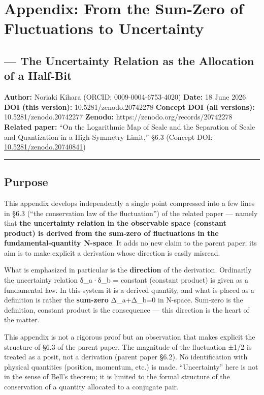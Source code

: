 \documentclass[11pt]{ltjsarticle}
\begin{document}
\section{Appendix: From the Sum-Zero of Fluctuations to
Uncertainty}\label{appendix-from-the-sum-zero-of-fluctuations-to-uncertainty}

\subsection{--- The Uncertainty Relation as the Allocation of a
Half-Bit}\label{the-uncertainty-relation-as-the-allocation-of-a-half-bit}

\textbf{Author:} Noriaki Kihara (ORCID: 0009-0004-6753-4020)
\textbf{Date:} 18 June 2026 \textbf{DOI (this version):}
10.5281/zenodo.20742278 \textbf{Concept DOI (all versions):}
10.5281/zenodo.20742277 \textbf{Zenodo:}
https://zenodo.org/records/20742278 \textbf{Related paper:} ``On the
Logarithmic Map of Scale and the Separation of Scale and Quantization in
a High-Symmetry Limit,'' §6.3 (Concept DOI:
\href{https://doi.org/10.5281/zenodo.20740841}{10.5281/zenodo.20740841})

\begin{center}\rule{0.5\linewidth}{0.5pt}\end{center}

\subsection{Purpose}\label{purpose}

This appendix develops independently a single point compressed into a
few lines in §6.3 (``the conservation law of the fluctuation'') of the
related paper --- namely that \textbf{the uncertainty relation in the
observable space (constant product) is derived from the sum-zero of
fluctuations in the fundamental-quantity N-space}. It adds no new claim
to the parent paper; its aim is to make explicit a derivation whose
direction is easily misread.

What is emphasized in particular is the \textbf{direction} of the
derivation. Ordinarily the uncertainty relation δ\_a·δ\_b = constant
(constant product) is given as a fundamental law. In this system it is a
derived quantity, and what is placed as a definition is rather the
\textbf{sum-zero} Δ\_a+Δ\_b=0 in N-space. Sum-zero is the definition,
constant product is the consequence --- this direction is the heart of
the matter.

This appendix is not a rigorous proof but an observation that makes
explicit the structure of §6.3 of the parent paper. The magnitude of the
fluctuation ±1/2 is treated as a posit, not a derivation (parent paper
§6.2). No identification with physical quantities (position, momentum,
etc.) is made. ``Uncertainty'' here is not in the sense of Bell's
theorem; it is limited to the formal structure of the conservation of a
quantity allocated to a conjugate pair.
\end{document}
